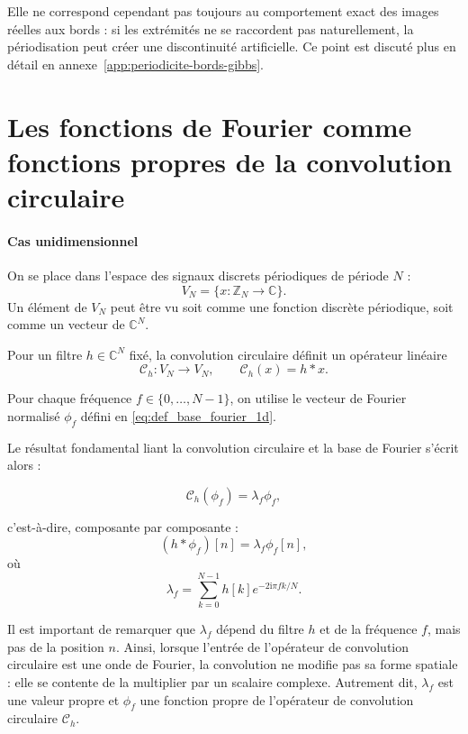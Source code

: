 Elle ne correspond cependant pas toujours au comportement exact des images réelles aux bords :
si les extrémités ne se raccordent pas naturellement, la périodisation peut créer une discontinuité
artificielle. Ce point est discuté plus en détail en annexe~\ref{app:periodicite-bords-gibbs}.

\section{Les fonctions de Fourier comme fonctions propres de la convolution circulaire}
\label{sec:fourier-vecteurs-propres}

\paragraph{Cas unidimensionnel}

On se place dans l'espace des signaux discrets périodiques de période $N$ :
\[
V_N = \{x : \mathbb{Z}_N \rightarrow \mathbb{C}\}.
\]
Un élément de $V_N$ peut être vu soit comme une fonction discrète périodique, soit comme un vecteur de $\mathbb{C}^N$.

Pour un filtre $h \in \mathbb{C}^N$ fixé, la convolution circulaire définit un opérateur linéaire
\[
\mathcal{C}_h : V_N \rightarrow V_N,
\qquad
\mathcal{C}_h(x) = h * x.
\]

Pour chaque fréquence $f \in \{0,\dots,N-1\}$, on utilise le vecteur de Fourier normalisé
$\phi_f$ défini en \eqref{eq:def_base_fourier_1d}.

Le résultat fondamental liant la convolution circulaire et la base de Fourier s'écrit alors :

\begin{equation}
\mathcal{C}_h(\phi_f) = \lambda_f \phi_f,
\label{eq:fourier_fonction_propre_conv_1d}
\end{equation}

c'est-à-dire, composante par composante :
\[
(h * \phi_f)[n] = \lambda_f \phi_f[n],
\]
où
\[
\lambda_f =
\sum_{k=0}^{N-1} h[k] e^{-2\mathrm{i}\pi f k/N}.
\]

Il est important de remarquer que $\lambda_f$ dépend du filtre $h$ et de la fréquence $f$,
mais pas de la position $n$. Ainsi, lorsque l'entrée de l'opérateur de convolution circulaire
est une onde de Fourier, la convolution ne modifie pas sa forme spatiale : elle se contente
de la multiplier par un scalaire complexe. Autrement dit, $\lambda_f$ est une valeur propre et
$\phi_f$ une fonction propre de l'opérateur de convolution circulaire
$\mathcal{C}_h$.

